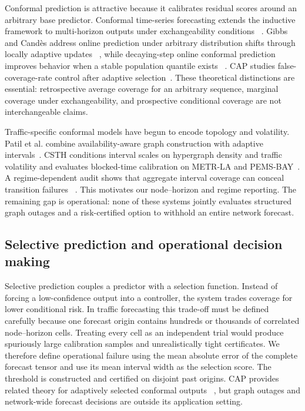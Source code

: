 \documentclass[preprint,12pt]{elsarticle}
\begin{document}
Conformal prediction is attractive because it calibrates residual scores around
an arbitrary base predictor. Conformal time-series forecasting extends the
inductive framework to multi-horizon outputs under exchangeability conditions
~\cite{stankeviciute2021conformal}. Gibbs and Cand\`es address online prediction
under arbitrary distribution shifts through locally adaptive updates
~\cite{gibbs2024online}, while decaying-step online conformal prediction
improves behavior when a stable population quantile exists
~\cite{angelopoulos2024online}. CAP studies false-coverage-rate control after
adaptive selection~\cite{bao2025cap}. These theoretical distinctions are
essential: retrospective average coverage for an arbitrary sequence, marginal
coverage under exchangeability, and prospective conditional coverage are not
interchangeable claims.

Traffic-specific conformal models have begun to encode topology and volatility.
Patil et al. combine availability-aware graph construction with adaptive
intervals~\cite{patil2024conformal}. CSTH conditions interval scales on
hypergraph density and traffic volatility and evaluates blocked-time
calibration on METR-LA and PEMS-BAY~\cite{wang2026csth}. A regime-dependent
audit shows that aggregate interval coverage can conceal transition failures
~\cite{wang2026regime}. This motivates our node--horizon and regime reporting.
The remaining gap is operational: none of these systems jointly evaluates
structured graph outages and a risk-certified option to withhold an entire
network forecast.

\subsection{Selective prediction and operational decision making}
Selective prediction couples a predictor with a selection function. Instead of
forcing a low-confidence output into a controller, the system trades coverage
for lower conditional risk. In traffic forecasting this trade-off must be
defined carefully because one forecast origin contains hundreds or thousands
of correlated node--horizon cells. Treating every cell as an independent trial
would produce spuriously large calibration samples and unrealistically tight
certificates. We therefore define operational failure using the mean absolute
error of the complete forecast tensor and use its mean interval width as the
selection score. The threshold is constructed and certified on disjoint past
origins. CAP provides related theory for adaptively selected conformal outputs
~\cite{bao2025cap}, but graph outages and network-wide forecast decisions are
outside its application setting.
\end{document}
